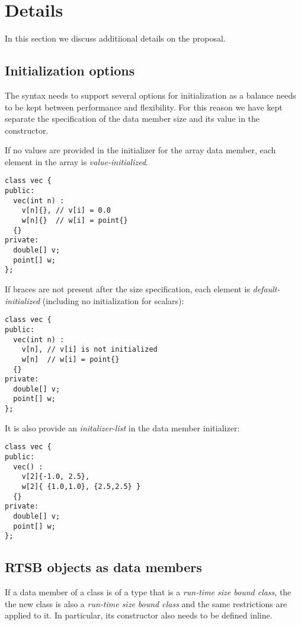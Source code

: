 \section{Details}

In this section we discuss additiional details on the proposal.

\subsection{Initialization options}

The syntax needs to support several options for initialization as a balance
needs to be kept between performance and flexibility. For this reason we have
kept separate the specification of the data member size and its value in the
constructor.

If no values are provided in the initializer for the array data member, each
element in the array is \emph{value-initialized}.

\begin{lstlisting}
class vec {
public:
  vec(int n) : 
    v[n]{}, // v[i] = 0.0
    w[n]{}  // w[i] = point{}
  {}
private:
  double[] v;
  point[] w;
};
\end{lstlisting}

If braces are not present after the size specification, each element is
\emph{default-initialized} (including no initialization for scalars):


\begin{lstlisting}
class vec {
public:
  vec(int n) : 
    v[n], // v[i] is not initialized
    w[n]  // w[i] = point{}
  {}
private:
  double[] v;
  point[] w;
};
\end{lstlisting}

It is also provide an \emph{initalizer-list} in the data member initializer:

\begin{lstlisting}
class vec {
public:
  vec() : 
    v[2]{-1.0, 2.5}, 
    w[2]{ {1.0,1.0}, {2.5,2.5} }
  {}
private:
  double[] v;
  point[] w;
};
\end{lstlisting}

\subsection{RTSB objects as data members}

If a data member of a class is of a type that is a \emph{run-time size bound class}, the the new 
class is also a \emph{run-time size bound class} and the same restrictions are
applied to it. In particular, its constructor also needs to be defined inline.

